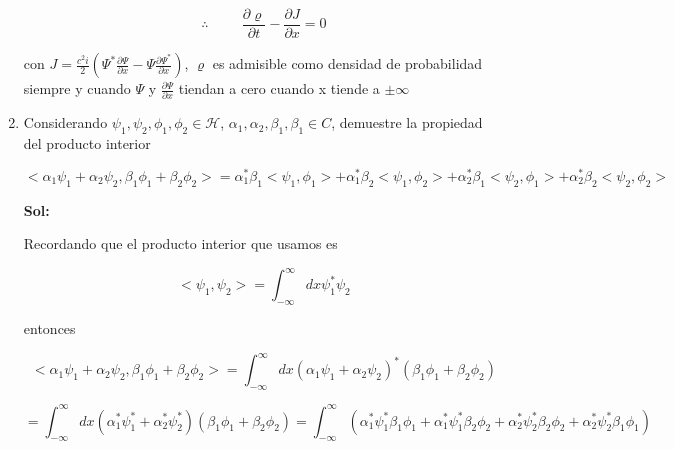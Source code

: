 \documentclass[12pt,a4paper]{article}
\begin{document}
\begin{enumerate}
    \begin{equation*}
        \therefore \hspace{1cm} \frac{\partial \varrho}{\partial t} - \frac{\partial J}{\partial x} = 0
    \end{equation*}
    
    con $J = \frac{c^2i}{2} \left(  \Psi^* \frac{\partial \Psi}{\partial x} - \Psi \frac{\partial \Psi^*}{\partial x} \right)$, $\varrho$ es admisible como densidad de probabilidad siempre y cuando $\Psi$ y $\frac{\partial \Psi}{\partial x}$ tiendan a cero cuando x tiende a $\pm \infty$
    
    
    
    
    
    
    \item Considerando $\psi_1 , \psi_2 , \phi_1 , \phi_2 \in \mathcal{H}$, $\alpha_1 , \alpha_2 , \beta_1 , \beta_1 \in C$, demuestre la propiedad del producto interior
    
    \begin{equation*}
        <\alpha_1 \psi_1 + \alpha_2 \psi_2, \beta_1 \phi_1 + \beta_2 \phi_2> = \alpha_1^* \beta_1 <\psi_1,\phi_1> + \alpha_1^* \beta_2 <\psi_1,\phi_2> + \alpha_2^* \beta_1 <\psi_2,\phi_1> + \alpha_2^* \beta_2 <\psi_2,\phi_2>
    \end{equation*}
    
    \textbf{Sol:}
    
    Recordando que el producto interior que usamos es
    
    \begin{equation*}
        <\psi_1 , \psi_2> = \int_{-\infty}^{\infty} dx  \psi_1^* \psi_2
    \end{equation*}
    
    entonces 
    
    \begin{equation*}
        <\alpha_1 \psi_1 + \alpha_2 \psi_2, \beta_1 \phi_1 + \beta_2 \phi_2> =  \int_{-\infty}^{\infty} dx   (\alpha_1 \psi_1 + \alpha_2 \psi_2)^* (\beta_1 \phi_1 + \beta_2 \phi_2)
    \end{equation*}
    
    \begin{equation*}
        = \int_{-\infty}^{\infty} dx   (\alpha_1^* \psi_1^* + \alpha_2^* \psi_2^*) (\beta_1 \phi_1 + \beta_2 \phi_2) = \int_{-\infty}^{\infty}    (\alpha_1^* \psi_1^* \beta_1 \phi_1 +\alpha_1^* \psi_1^* \beta_2 \phi_2 +\alpha_2^* \psi_2^*  \beta_2 \phi_2 + \alpha_2^* \psi_2^* \beta_1 \phi_1)
    \end{equation*}
    

\end{enumerate}
\end{document}
